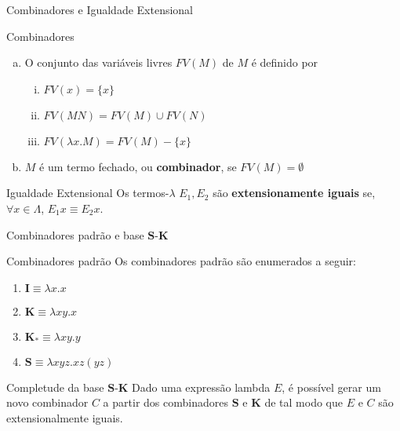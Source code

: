 \begin{frame}[fragile]{Combinadores e Igualdade Extensional}

    \begin{block}{Combinadores}
        \begin{enumerate}[(a)]
            \item O conjunto das variáveis livres $FV(M)$ de $M$ é definido por
            \begin{enumerate}[i.]
                \item $FV(x) = \lbrace x\rbrace$
                \item $FV(MN) = FV(M)\cup FV(N)$
                \item $FV(\lambda x.M) = FV(M) - \lbrace x\rbrace$
            \end{enumerate}

            \item $M$ é um termo fechado, ou \textbf{combinador}, se $FV(M) = \emptyset$
        \end{enumerate}
    \end{block}

    \vspace{0.1in}

    \begin{block}{Igualdade Extensional}
        Os termos-$\lambda$ $E_1, E_2$ são \textbf{extensionamente iguais} se, 
        $\forall x\in\Lambda$, $E_1x \equiv E_2x$.
    \end{block}

\end{frame}

\begin{frame}[fragile]{Combinadores padrão e base $\mathbf{S}$-$\mathbf{K}$}

    \begin{block}{Combinadores padrão}
        Os combinadores padrão são enumerados a seguir: 
        \begin{enumerate}
            \item $\mathbf{I} \equiv \lambda x.x$ 
            \item $\mathbf{K} \equiv \lambda xy.x$ 
            \item $\mathbf{K_*} \equiv \lambda xy.y$ 
            \item $\mathbf{S} \equiv \lambda xyz.xz(yz)$
        \end{enumerate}
    \end{block}

    \vspace{0.1in}

    \begin{block}{Completude da base $\mathbf{S}$-$\mathbf{K}$}
        Dado uma expressão lambda $E$, é possível gerar um novo combinador $C$ a partir dos
        combinadores $\mathbf{S}$ e $\mathbf{K}$ de tal modo que $E$ e $C$ são
        extensionalmente iguais.
    \end{block}

\end{frame}

